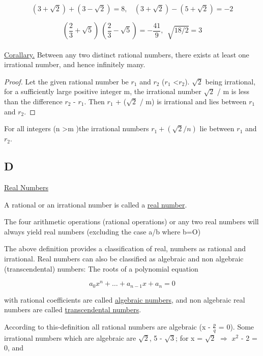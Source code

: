 \documentclass{amsbook}
\begin{document}

\begin{equation*}
    (3+ \sqrt{2}) + (3 -\sqrt{2}) = 8, \ \ \ \ (3 + \sqrt{2}) - (5 + \sqrt{2}) = -2
\end{equation*}

\begin{equation*}
    (\frac{2}{3} + \sqrt{5})\ (\frac{2}{3} - \sqrt{5}) = -\frac{41}{9}, \ \ \sqrt{18/2}=3  
\end{equation*} 
\\
\indent \underline{Corallary.} Between any two distinct rational numbers, there exists at least one irrational number, and hence infinitely many.

\begin{proof}
	Let the given rational number be $r_1$ and $r_2$ ($r_1$ \textless $r_2$). $\sqrt{2}$ being irrational, for a sufficiently large positive integer m, the irrational number $\sqrt{2}$ / m is less than the difference $r_2$ - $r_1$. Then $r_1$ + ($\sqrt{2}$ / m) is irrational and lies between $r_1$ and $r_2$.
\end{proof} 

\indent For all integers (n \textgreater m )the irrational numbers $r_1 + (\sqrt{2}/n)$ lie between $r_1$ and $r_2$. 

\subsection*{D}{\underline{Real Numbers}}

A rational or an irrational number is called a \underline{real number}. 

The four arithmetic operations (rational operations) or any two real numbers will always yield real numbers (excluding the case a/b where b=O) 

The above definition provides a classification of real, numbers as rational and irrational. Real numbers can also be classified as algebraic and non algebraic (transcendental) numbers:
The roots of a polynomial equation

\begin{equation*}
    a_0x^n + \dots + a_{n-1}x + a_n = 0
\end{equation*}

with rational coefficients are called \underline{algebraic numbers}, and non algebraic real numbers are called \underline{transcendental numbers}.

According to this-definition all rational numbers are algebraic (x - $\frac{p}{q}$ = 0). Some irrational numbers which are algebraic are $\sqrt{2}$, 5 - $\sqrt{3}$; for x = $\sqrt{2}$ $\Rightarrow$ $x^2$ - 2 = 0, and
\end{document}
